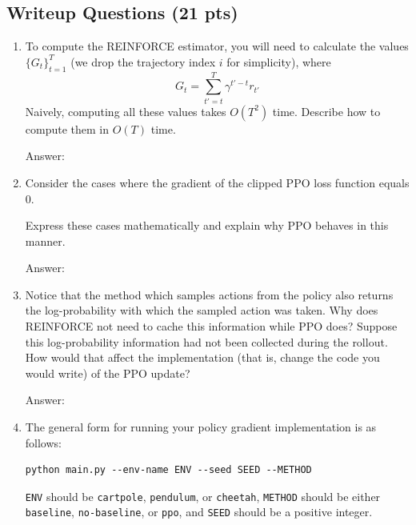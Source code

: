 \documentclass{article}
\begin{document}
\subsection{Writeup Questions (21 pts)}
\begin{enumerate}
\item[(a) (3 pts)] To compute the REINFORCE estimator, you will need to calculate the values $\{G_t\}_{t=1}^{T}$ (we drop the trajectory index $i$ for simplicity), where
$$
G_t = \sum_{t'=t}^{T} \gamma^{t'-t} r_{t'}
$$
Naively, computing all these values takes $O(T^2)$ time. Describe how to compute them in $O(T)$ time.

\begin{tcolorbox}[breakable]
Answer:
\end{tcolorbox}
\clearpage 
\item[(b) (3 pts)] Consider the cases where the gradient of the clipped PPO loss function equals 0. 

Express these cases mathematically and explain why PPO behaves in this manner.

\begin{tcolorbox}[breakable]
Answer:
\end{tcolorbox}
\clearpage 
\item[(c) (3 pts)] Notice that the method which samples actions from the policy also returns the log-probability with which the sampled action was taken. Why does REINFORCE not need to cache this information while PPO does? Suppose this log-probability information had not been collected during the rollout. How would that affect the implementation (that is, change the code you would write) of the PPO update? 

\begin{tcolorbox}[breakable]
Answer:
\end{tcolorbox}
\clearpage
\item[(d) (12 pts)] The general form for running your policy gradient implementation is as follows:
\begin{tcolorbox}
\begin{verbatim}
python main.py --env-name ENV --seed SEED --METHOD
\end{verbatim}
\end{tcolorbox}
\texttt{ENV} should be \texttt{cartpole}, \texttt{pendulum}, or \texttt{cheetah}, \texttt{METHOD} should be either \texttt{baseline}, \texttt{no-baseline}, or \texttt{ppo}, and \texttt{SEED} should be a positive integer.


\end{enumerate}
\end{document}
